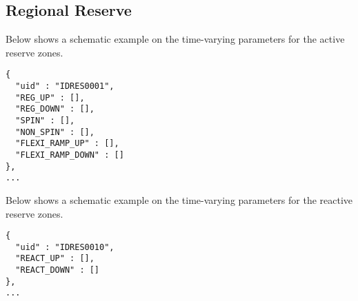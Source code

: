 \subsection{Regional Reserve}
\label{sec:reserve_time}
Below shows a schematic example on the time-varying parameters for the active reserve zones. 

\begin{verbatim}
{
  "uid" : "IDRES0001",
  "REG_UP" : [],
  "REG_DOWN" : [],
  "SPIN" : [],
  "NON_SPIN" : [],  
  "FLEXI_RAMP_UP" : [],  
  "FLEXI_RAMP_DOWN" : []
},
...
\end{verbatim}


Below shows a schematic example on the time-varying parameters for the reactive reserve zones. 
\begin{verbatim}
{
  "uid" : "IDRES0010",
  "REACT_UP" : [],
  "REACT_DOWN" : []
},
...
\end{verbatim}

